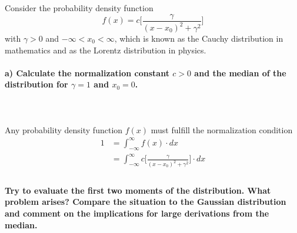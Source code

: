 Consider the probability density function
\begin{equation}
    f(x)=c\bigg[\frac{\gamma}{(x-x_0)^2+\gamma^2}\bigg]
\end{equation}
with $\gamma>0$ and $-\infty<x_0<\infty$, which is known as the 
Cauchy distribution in mathematics and as the Lorentz distribution
in physics.

\paragraph{a) Calculate the normalization constant $c>0$ and the median
    of the distribution for $\gamma=1$ and $x_0=0$.
} \ \\
\\
    Any probability density function $f(x)$ must fulfill the normalization 
    condition
    \begin{align}
        1
        &=\int_{-\infty}^\infty f(x)\cdot dx \\
        &=\int_{-\infty}^\infty c\bigg[
            \frac{\gamma}{(x-x_0)^2+\gamma^2}
        \bigg]\cdot dx \\
    \end{align}

\paragraph{Try to evaluate the first two moments of the distribution.
    What problem arises? Compare the situation to the Gaussian 
    distribution and comment on the implications for large derivations
    from the median.
} \ \\
\\
